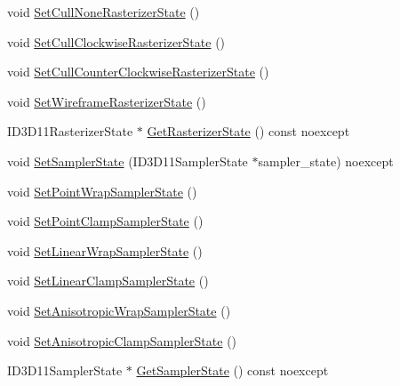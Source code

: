 \begin{DoxyCompactItemize}
\item 
void \hyperlink{structmage_1_1_rendering_state_a4841e36e7be34f949da1d4088f217a1a}{Set\+Cull\+None\+Rasterizer\+State} ()
\item 
void \hyperlink{structmage_1_1_rendering_state_a707034239265916d82e7dbe168f09cb6}{Set\+Cull\+Clockwise\+Rasterizer\+State} ()
\item 
void \hyperlink{structmage_1_1_rendering_state_aa66215168ce8752ef20065b161bad1fc}{Set\+Cull\+Counter\+Clockwise\+Rasterizer\+State} ()
\item 
void \hyperlink{structmage_1_1_rendering_state_a392b339b24950c71bfc7285bcca5eacf}{Set\+Wireframe\+Rasterizer\+State} ()
\item 
I\+D3\+D11\+Rasterizer\+State $\ast$ \hyperlink{structmage_1_1_rendering_state_a46b7f58a95f8029598d8354fdf02840f}{Get\+Rasterizer\+State} () const noexcept
\item 
void \hyperlink{structmage_1_1_rendering_state_a3829b0bd0eaedc664542481445ab226b}{Set\+Sampler\+State} (I\+D3\+D11\+Sampler\+State $\ast$sampler\+\_\+state) noexcept
\item 
void \hyperlink{structmage_1_1_rendering_state_ab8cebd05d1b01ec22f311aa0f1c1dc7e}{Set\+Point\+Wrap\+Sampler\+State} ()
\item 
void \hyperlink{structmage_1_1_rendering_state_aabf9e70b12cb12560e6c6c880bbc08ca}{Set\+Point\+Clamp\+Sampler\+State} ()
\item 
void \hyperlink{structmage_1_1_rendering_state_a6ffd109271b4988fa6d4a6fc2daa2125}{Set\+Linear\+Wrap\+Sampler\+State} ()
\item 
void \hyperlink{structmage_1_1_rendering_state_a4f414c7bed884194bd93d89f893c86b4}{Set\+Linear\+Clamp\+Sampler\+State} ()
\item 
void \hyperlink{structmage_1_1_rendering_state_a92318b9b250555ca1d6b516d49371abc}{Set\+Anisotropic\+Wrap\+Sampler\+State} ()
\item 
void \hyperlink{structmage_1_1_rendering_state_a52b80c58015fb64f0b8afa7712807ccd}{Set\+Anisotropic\+Clamp\+Sampler\+State} ()
\item 
I\+D3\+D11\+Sampler\+State $\ast$ \hyperlink{structmage_1_1_rendering_state_a72a0817f0041d49af156f8115347460d}{Get\+Sampler\+State} () const noexcept
\end{DoxyCompactItemize}
